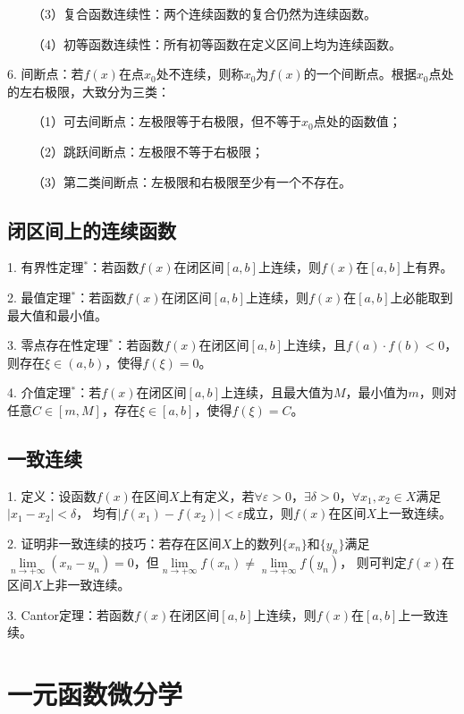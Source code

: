 ~~~~（3）复合函数连续性：两个连续函数的复合仍然为连续函数。

~~~~（4）初等函数连续性：所有初等函数在定义区间上均为连续函数。

6. 间断点：若$f(x)$在点$x_0$处不连续，则称$x_0$为$f(x)$的一个间断点。根据$x_0$点处的左右极限，大致分为三类：

~~~~（1）可去间断点：左极限等于右极限，但不等于$x_0$点处的函数值；

~~~~（2）跳跃间断点：左极限不等于右极限；

~~~~（3）第二类间断点：左极限和右极限至少有一个不存在。

\subsection{闭区间上的连续函数}

1. 有界性定理$^*$：若函数$f(x)$在闭区间$[a,b]$上连续，则$f(x)$在$[a,b]$上有界。

2. 最值定理$^*$：若函数$f(x)$在闭区间$[a,b]$上连续，则$f(x)$在$[a,b]$上必能取到最大值和最小值。

3. 零点存在性定理$^*$：若函数$f(x)$在闭区间$[a,b]$上连续，且$f(a)\cdot f(b)<0$，则存在$\xi \in (a,b)$，使得$f(\xi)=0$。

4. 介值定理$^*$：若$f(x)$在闭区间$[a,b]$上连续，且最大值为$M$，最小值为$m$，则对任意$C\in[m,M]$，存在$\xi \in [a,b]$，使得$f(\xi) =C$。

\subsection{一致连续}

1. 定义：设函数$f(x)$在区间$X$上有定义，若$\forall \varepsilon>0$，$\exists \delta >0$，$\forall x_1,x_2\in X$满足$\left|x_1-x_2\right|<\delta$，
均有$\left|f(x_1)-f(x_2)\right|<\varepsilon$成立，则$f(x)$在区间$X$上一致连续。

2. 证明非一致连续的技巧：若存在区间$X$上的数列$\{x_n\}$和$\{y_n\}$满足$\lim\limits_{n\rightarrow +\infty}\left(x_n-y_n\right)=0$，但$\lim\limits_{n\rightarrow +\infty}f(x_n) \neq \lim\limits_{n\rightarrow +\infty}f(y_n)$，
则可判定$f(x)$在区间$X$上非一致连续。

3. Cantor定理：若函数$f(x)$在闭区间$[a,b]$上连续，则$f(x)$在$[a,b]$上一致连续。

\section{一元函数微分学}

